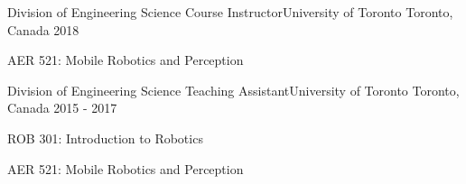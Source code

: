 

\begin{cventries}

  \cventry
    {Division of Engineering Science} %
    {Course Instructor{\enskip\cdotp\enskip}University of Toronto} %
    {Toronto, Canada} %
    {2018} %
    {
      \begin{cvitems} %
        \item {AER 521: Mobile Robotics and Perception}
      \end{cvitems}
    }

    \cventry
    {Division of Engineering Science} %
    {Teaching Assistant{\enskip\cdotp\enskip}University of Toronto} %
    {Toronto, Canada} %
    {2015 - 2017} %
    {
      \begin{cvitems} %
        \item {ROB 301: Introduction to Robotics}
        \item {AER 521: Mobile Robotics and Perception}
      \end{cvitems}
    }

\end{cventries}
